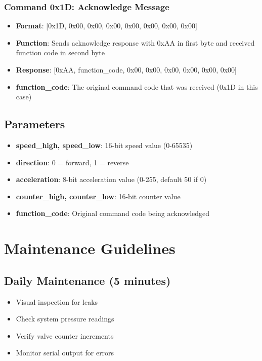 \documentclass[11pt,a4paper]{article}
\begin{document}
\subsubsection{Command 0x1D: Acknowledge Message}
\begin{itemize}
    \item \textbf{Format}: [0x1D, 0x00, 0x00, 0x00, 0x00, 0x00, 0x00, 0x00]
    \item \textbf{Function}: Sends acknowledge response with 0xAA in first byte and received function code in second byte
    \item \textbf{Response}: [0xAA, function\_code, 0x00, 0x00, 0x00, 0x00, 0x00, 0x00]
    \item \textbf{function\_code}: The original command code that was received (0x1D in this case)
\end{itemize}

\subsection{Parameters}
\begin{itemize}
    \item \textbf{speed\_high, speed\_low}: 16-bit speed value (0-65535)
    \item \textbf{direction}: 0 = forward, 1 = reverse
    \item \textbf{acceleration}: 8-bit acceleration value (0-255, default 50 if 0)
    \item \textbf{counter\_high, counter\_low}: 16-bit counter value
    \item \textbf{function\_code}: Original command code being acknowledged
\end{itemize}

\section{Maintenance Guidelines}

\subsection{Daily Maintenance (5 minutes)}
\begin{itemize}[label=$\square$]
    \item Visual inspection for leaks
    \item Check system pressure readings
    \item Verify valve counter increments
    \item Monitor serial output for errors
\end{itemize}
\end{document}
